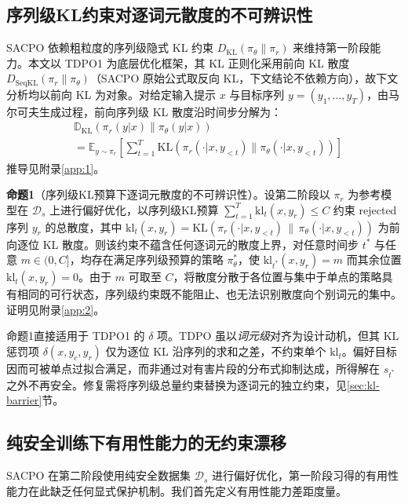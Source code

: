 \documentclass[lettersize,journal]{IEEEtran}
\begin{document}
\subsection{序列级KL约束对逐词元散度的不可辨识性}\label{prop1}
SACPO 依赖粗粒度的序列级隐式 KL 约束 $D_{\text{KL}}(\pi_\theta \| \pi_r)$ 来维持第一阶段能力。本文以 TDPO1 为底层优化框架，其 KL 正则化采用前向 KL 散度 $D_{\text{SeqKL}}(\pi_r \| \pi_\theta)$（SACPO 原始公式取反向 KL，下文结论不依赖方向），故下文分析均以前向 KL 为对象。对给定输入提示 $x$ 与目标序列 $y = (y_1, \dots, y_T)$，由马尔可夫生成过程，前向序列级 KL 散度沿时间步分解为：
\begin{equation}
\begin{aligned}
    &\mathbb{D}_{\text{KL}}(\pi_r(y|x) \| \pi_\theta(y|x)) \\
    &= \mathbb{E}_{y \sim \pi_r} \left[ \sum_{t=1}^T \text{KL} \left( \pi_r(\cdot|x, y_{<t}) \| \pi_\theta(\cdot|x, y_{<t}) \right) \right]
\end{aligned}
\end{equation}
推导见附录\ref{app:1}。

\textbf{命题1}（序列级KL预算下逐词元散度的不可辨识性）。设第二阶段以 $\pi_r$ 为参考模型在 $\mathcal{D}_s$ 上进行偏好优化，以序列级KL预算 $\sum_{t=1}^{T} \mathrm{kl}_t(x, y_r) \le C$ 约束 rejected 序列 $y_r$ 的总散度，其中 $\mathrm{kl}_t(x, y_r) = \mathrm{KL}(\pi_r(\cdot|x, y_{<t}) \,\|\, \pi_\theta(\cdot|x, y_{<t}))$ 为前向逐位 KL 散度。则该约束不蕴含任何逐词元的散度上界，对任意时间步 $t^*$ 与任意 $m \in (0, C]$，均存在满足序列级预算的策略 $\pi_\theta^*$，使 $\mathrm{kl}_{t^*}(x, y_r) = m$ 而其余位置 $\mathrm{kl}_t(x, y_r) = 0$。由于 $m$ 可取至 $C$，将散度分散于各位置与集中于单点的策略具有相同的可行状态，序列级约束既不能阻止、也无法识别散度向个别词元的集中。证明见附录\ref{app:2}。

命题1直接适用于 TDPO1 的 $\delta$ 项。TDPO 虽以\textit{词元级}对齐为设计动机，但其 KL 惩罚项 $\delta(x, y_c, y_r)$ 仅为逐位 KL 沿序列的求和之差，不约束单个 $\mathrm{kl}_t$。偏好目标因而可被单点过拟合满足，而非通过对有害片段的分布式抑制达成，所得解在 $s_{t^*}$ 之外不再安全。修复需将序列级总量约束替换为逐词元的独立约束，见\ref{sec:kl-barrier}节。

\subsection{纯安全训练下有用性能力的无约束漂移}\label{prop2}
SACPO 在第二阶段使用纯安全数据集 $\mathcal{D}_s$ 进行偏好优化，第一阶段习得的有用性能力在此缺乏任何显式保护机制。我们首先定义有用性能力差距度量。
\end{document}

